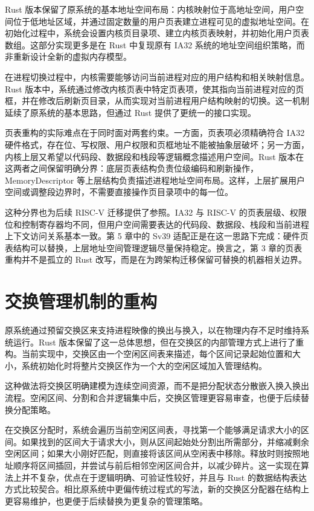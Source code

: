 Rust 版本保留了原系统的基本地址空间布局：内核映射位于高地址空间，用户空间位于低地址区域，并通过固定数量的用户页表建立进程可见的虚拟地址空间。在初始化过程中，系统会设置内核页目录项、建立内核页表映射，并初始化用户页表数组。这部分实现更多是在 Rust 中复现原有 IA32 系统的地址空间组织策略，而非重新设计全新的虚拟内存模型。

在进程切换过程中，内核需要能够访问当前进程对应的用户结构和相关映射信息。Rust 版本中，系统通过修改内核页表中特定页表项，使其指向当前进程对应的页框，并在修改后刷新页目录，从而实现对当前进程用户结构映射的切换。这一机制延续了原系统的基本思路，但通过 Rust 提供了更统一的接口实现。

页表重构的实际难点在于同时面对两套约束。一方面，页表项必须精确符合 IA32 硬件格式，存在位、写权限、用户权限和页框地址不能被抽象层破坏；另一方面，内核上层又希望以代码段、数据段和栈段等逻辑概念描述用户空间。Rust 版本在这两者之间保留明确分界：底层页表结构负责位级编码和刷新操作，MemoryDescriptor 等上层结构负责描述进程地址空间布局。这样，上层扩展用户空间或调整段边界时，不需要直接操作页目录项中的每一位。

这种分界也为后续 RISC-V 迁移提供了参照。IA32 与 RISC-V 的页表层级、权限位和控制寄存器均不同，但用户空间需要表达的代码段、数据段、栈段和当前进程上下文访问关系基本一致。第 5 章中的 Sv39 适配正是在这一思路下完成：硬件页表结构可以替换，上层地址空间管理逻辑尽量保持稳定。换言之，第 3 章的页表重构并不是孤立的 Rust 改写，而是在为跨架构迁移保留可替换的机器相关边界。

\section{交换管理机制的重构}

原系统通过预留交换区来支持进程映像的换出与换入，以在物理内存不足时维持系统运行。Rust 版本保留了这一总体思想，但在交换区的内部管理方式上进行了重构。当前实现中，交换区由一个空闲区间表来描述，每个区间记录起始位置和大小，系统初始化时将整片交换区作为一个大的空闲区域加入管理结构。

这种做法将交换区明确建模为连续空间资源，而不是把分配状态分散嵌入换入换出流程。空闲区间、分割和合并逻辑集中后，交换区管理更容易审查，也便于后续替换分配策略。

在交换区分配时，系统会遍历当前空闲区间表，寻找第一个能够满足请求大小的区间。如果找到的区间大于请求大小，则从区间起始处分割出所需部分，并缩减剩余空闲区间；如果大小刚好匹配，则直接将该区间从空闲表中移除。释放时则按照地址顺序将区间插回，并尝试与前后相邻空闲区间合并，以减少碎片。这一实现在算法上并不复杂，优点在于逻辑明确、可验证性较好，并且与 Rust 的数据结构表达方式比较契合。相比原系统中更偏传统过程式的写法，新的交换区分配器在结构上更容易维护，也更便于后续替换为更复杂的管理策略。

